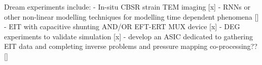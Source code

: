 Dream experiments include:
- In-situ CBSR strain TEM imaging [x]
- RNNs or other non-linear modelling techniques for modelling time dependent phenomena []
- EIT with capacitive shunting AND/OR EFT-ERT MUX device [x]
- DEG experiments to validate simulation [x]
- develop an ASIC dedicated to gathering EIT data and completing inverse problems and pressure mapping co-processing?? []


